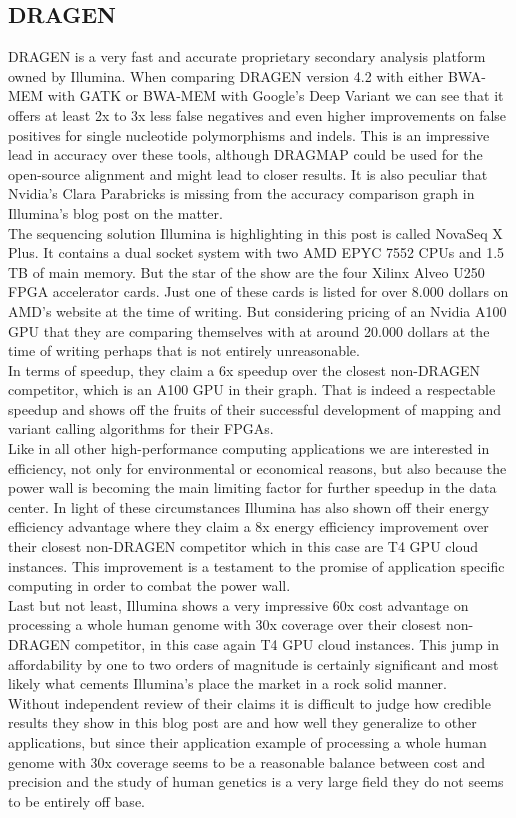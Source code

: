 \documentclass[conference]{IEEEtran}
\begin{document}
\subsection{DRAGEN}
DRAGEN is a very fast and accurate proprietary secondary analysis platform owned by Illumina. When comparing DRAGEN version 4.2 with either BWA-MEM with GATK or BWA-MEM with Google's Deep Variant we can see that it offers at least 2x to 3x less false negatives and even higher improvements on false positives for single nucleotide polymorphisms and indels. This is an impressive lead in accuracy over these tools, although DRAGMAP could be used for the open-source alignment and might lead to closer results. It is also peculiar that Nvidia's Clara Parabricks is missing from the accuracy comparison graph in Illumina's blog post on the matter. \\
The sequencing solution Illumina is highlighting in this post is called NovaSeq X Plus. It contains a dual socket system with two AMD EPYC 7552 CPUs and 1.5 TB of main memory. But the star of the show   are the four Xilinx Alveo U250 FPGA accelerator cards. Just one of these cards is listed for over 8.000 dollars on AMD's website at the time of writing. But considering pricing of an Nvidia A100 GPU that they are comparing themselves with at around 20.000 dollars at the time of writing perhaps that is not entirely unreasonable.\\
In terms of speedup, they claim a 6x speedup over the closest non-DRAGEN competitor, which is an A100 GPU in their graph. That is indeed a respectable speedup and shows off the fruits of their successful development of mapping and variant calling algorithms for their FPGAs. \\
Like in all other high-performance computing applications we are interested in efficiency, not only for environmental or economical reasons, but also because the power wall is becoming the main limiting factor for further speedup in the data center. In light of these circumstances Illumina has also shown off their energy efficiency advantage where they claim a 8x energy efficiency improvement over their closest non-DRAGEN competitor which in this case are T4 GPU cloud instances. This improvement is a testament to the promise of application specific computing in order to combat the power wall. \\
Last but not least, Illumina shows a very impressive 60x cost advantage on processing a whole human genome with 30x coverage over their closest non-DRAGEN competitor, in this case again T4 GPU cloud instances. This jump in affordability by one to two orders of magnitude is certainly significant and most likely what cements Illumina's place the market in a rock solid manner\cite{noauthor_inside_nodate}. \\
Without independent review of their claims it is difficult to judge how credible results they show in this blog post are and how well they generalize to other applications, but since their application example of processing a whole human genome with 30x coverage seems to be a reasonable balance between cost and precision and the study of human genetics is a very large field they do not seems to be entirely off base. \\
\end{document}
